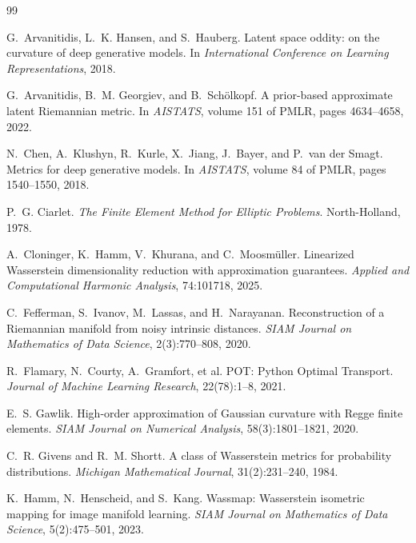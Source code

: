 \raggedbottom
\begin{thebibliography}{99}
\small
\setlength{\itemsep}{0.35em}
\setlength{\parskip}{0pt}

G.~Arvanitidis, L.~K. Hansen, and S.~Hauberg.
\newblock Latent space oddity: on the curvature of deep generative models.
\newblock In \emph{International Conference on Learning Representations}, 2018.

G.~Arvanitidis, B.~M. Georgiev, and B.~Sch\"olkopf.
\newblock A prior-based approximate latent Riemannian metric.
\newblock In \emph{AISTATS}, volume 151 of PMLR, pages 4634--4658, 2022.

N.~Chen, A.~Klushyn, R.~Kurle, X.~Jiang, J.~Bayer, and P.~van der Smagt.
\newblock Metrics for deep generative models.
\newblock In \emph{AISTATS}, volume 84 of PMLR, pages 1540--1550, 2018.

P.~G. Ciarlet.
\newblock \emph{The Finite Element Method for Elliptic Problems}.
\newblock North-Holland, 1978.

A.~Cloninger, K.~Hamm, V.~Khurana, and C.~Moosm\"uller.
\newblock Linearized Wasserstein dimensionality reduction with approximation
guarantees.
\newblock \emph{Applied and Computational Harmonic Analysis}, 74:101718, 2025.

C.~Fefferman, S.~Ivanov, M.~Lassas, and H.~Narayanan.
\newblock Reconstruction of a Riemannian manifold from noisy intrinsic
distances.
\newblock \emph{SIAM Journal on Mathematics of Data Science}, 2(3):770--808,
2020.

R.~Flamary, N.~Courty, A.~Gramfort, et al.
\newblock POT: Python Optimal Transport.
\newblock \emph{Journal of Machine Learning Research}, 22(78):1--8, 2021.

E.~S. Gawlik.
\newblock High-order approximation of Gaussian curvature with Regge finite
elements.
\newblock \emph{SIAM Journal on Numerical Analysis}, 58(3):1801--1821, 2020.

C.~R. Givens and R.~M. Shortt.
\newblock A class of Wasserstein metrics for probability distributions.
\newblock \emph{Michigan Mathematical Journal}, 31(2):231--240, 1984.

K.~Hamm, N.~Henscheid, and S.~Kang.
\newblock Wassmap: Wasserstein isometric mapping for image manifold learning.
\newblock \emph{SIAM Journal on Mathematics of Data Science},
5(2):475--501, 2023.


\end{thebibliography}
